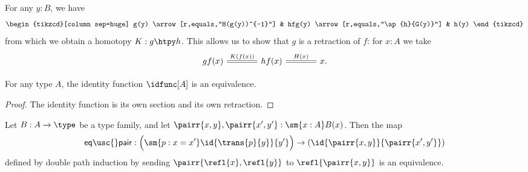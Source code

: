 \begin{constr}
For any $y:B$, we have 
\begin{equation*}
\begin{tikzcd}[column sep=huge]
g(y) \arrow[r,equals,"H(g(y))^{-1}"] & hfg(y) \arrow[r,equals,"\ap{h}{G(y)}"] & h(y)
\end{tikzcd}
\end{equation*} 
from which we obtain a homotopy $K:g\htpy h$.
This allows us to show that $g$ is a retraction of $f$: for $x:A$ we take
\begin{equation*}
\begin{tikzcd}[column sep=large]
gf(x) \arrow[r,equals,"K(f(x))"] & hf(x) \arrow[r,equals,"H(x)"] & x.
\end{tikzcd}\qedhere
\end{equation*}
\end{constr}

\begin{thm}\label{thm:id_equiv}
For any type $A$, the identity function $\idfunc[A]$ is an equivalence.
\end{thm}

\begin{proof}
The identity function is its own section and its own retraction.
\end{proof}

\begin{thm}\label{thm:eq_sigma}
Let $B:A\to\type$ be a type family, and let $\pairr{x,y},\pairr{x',y'}:\sm{x:A}B(x)$. Then the map
\begin{equation*}
\mathsf{eq\usc{}pair} : \Big(\sm{p:x=x'}\id{\trans{p}{y}}{y'}\Big)\to(\id{\pairr{x,y}}{\pairr{x',y'}})
\end{equation*}
defined by double path induction by sending $\pairr{\refl{x},\refl{y}}$ to $\refl{\pairr{x,y}}$ is an equivalence.
\end{thm}

